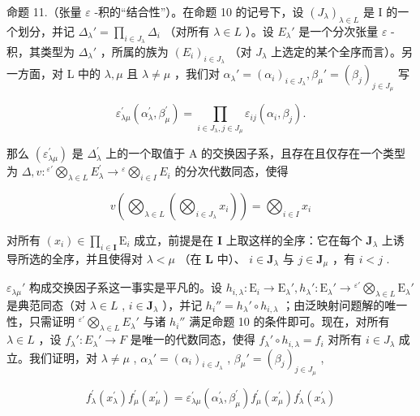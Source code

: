 命题 11.（张量 \(\varepsilon\) -积的“结合性”）。在命题 10 的记号下，设 \((J_{\lambda})_{\lambda \in L}\) 是 I 的一个划分，并记 \(\Delta_{\lambda}' = \prod_{i \in J_{\lambda}} \Delta_i\) （对所有 \(\lambda \in L\) ）。设 \(E_{\lambda}'\) 是一个分次张量 \(\varepsilon\) -积，其类型为 \(\Delta_{\lambda}'\) ，所属的族为 \((E_i)_{i \in J_{\lambda}}\) （对 \(J_{\lambda}\) 上选定的某个全序而言）。另一方面，对 L 中的 \(\lambda, \mu\) 且 \(\lambda \neq \mu\) ，我们对 \(\alpha_{\lambda}' = (\alpha_i)_{i \in J_{\lambda}}, \beta_{\mu}' = (\beta_j)_{j \in J_{\mu}}\) 写

\[
\varepsilon_ {\lambda \mu} ^ {\prime} (\alpha _ {\lambda} ^ {\prime}, \beta_ {\mu} ^ {\prime}) = \prod_ {i \in J _ {\lambda}, j \in J _ {\mu}} \varepsilon_ {i j} (\alpha_ {i}, \beta_ {j}).\tag{32}
\]

那么 \((\varepsilon_{\lambda \mu}^{\prime})\) 是 \(\Delta_{\lambda}^{\prime}\) 上的一个取值于 A 的交换因子系，且存在且仅存在一个类型为 \(\Delta, v: {}^{\varepsilon'}\bigotimes_{\lambda \in L} E_{\lambda}^{\prime} \to {}^{\varepsilon}\bigotimes_{i \in I} E_{i}\) 的分次代数同态，使得

\[
v \left(\bigotimes_ {\lambda \in L} \left(\bigotimes_ {i \in J _ {\lambda}} x _ {i}\right)\right) = \bigotimes_ {i \in I} x _ {i}\tag{33}
\]

对所有 \((x_{i})\in \prod_{i\in \mathbf{I}}\mathrm{E}_{i}\) 成立，前提是在 \(\mathbf{I}\) 上取这样的全序：它在每个 \(\mathbf{J}_{\lambda}\) 上诱导所选的全序，并且使得对 \(\lambda < \mu\) （在 \(\mathbf{L}\) 中）、 \(i\in \mathbf{J}_{\lambda}\) 与 \(j\in \mathbf{J}_{\mu}\) ，有 \(i < j\) .

\(\varepsilon_{\lambda \mu}'\) 构成交换因子系这一事实是平凡的。设 \(h_{i,\lambda}:\mathrm{E}_i\to \mathrm{E}_{\lambda}', h_{\lambda}':\mathrm{E}_{\lambda}'\to {}^{\varepsilon'}\bigotimes_{\lambda \in L}\mathrm{E}_{\lambda}'\) 是典范同态（对 \(\lambda \in L\) , \(i\in \mathbf{J}_{\lambda}\) ），并记 \(h_i'' = h_\lambda' \circ h_{i,\lambda}\) ；由泛映射问题解的唯一性，只需证明 \({}^{\varepsilon'}\bigotimes_{\lambda \in L} E_{\lambda}'\) 与诸 \(h_i''\) 满足命题 10 的条件即可。现在，对所有 \(\lambda \in L\) ，设 \(f_{\lambda}': E_{\lambda}' \to F\) 是唯一的代数同态，使得 \(f_{\lambda}' \circ h_{i,\lambda} = f_i\) 对所有 \(i \in J_{\lambda}\) 成立。我们证明，对 \(\lambda \neq \mu\) , \(\alpha_{\lambda}' = (\alpha_i)_{i \in J_{\lambda}}\) , \(\beta_{\mu}' = (\beta_j)_{j \in J_{\mu}}\) ,

\[
f _ {\lambda} ^ {\prime} (x _ {\lambda} ^ {\prime}) f _ {\mu} ^ {\prime} (x _ {\mu} ^ {\prime}) = \varepsilon_ {\lambda \mu} ^ {\prime} (\alpha_ {\lambda} ^ {\prime}, \beta_ {\mu} ^ {\prime}) f _ {\mu} ^ {\prime} (x _ {\mu} ^ {\prime}) f _ {\lambda} ^ {\prime} (x _ {\lambda} ^ {\prime})\tag{34}
\]


